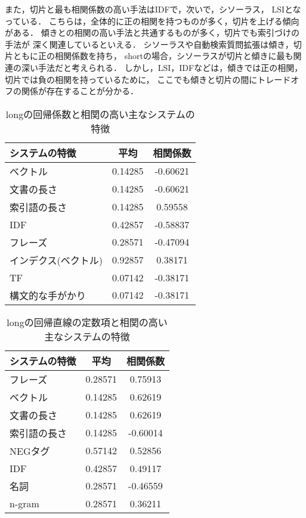 また，切片と最も相関係数の高い手法はIDFで，次いで，シソーラス，
LSIとなっている．
こちらは，全体的に正の相関を持つものが多く，切片を上げる傾向がある．
傾きとの相関の高い手法と共通するものが多く，切片でも索引づけの手法が
深く関連しているといえる．
シソーラスや自動検索質問拡張は傾き，切片ともに正の相関係数を持ち，
shortの場合，シソーラスが切片と傾きに最も関連の深い手法だと考えられる．
しかし，LSI，IDFなどは，傾きでは正の相関，切片では負の相関を持っているために，
ここでも傾きと切片の間にトレードオフの関係が存在することが分かる．

\begin{table}[t]
\renewcommand{\arraystretch}{}
\caption{longの回帰係数と相関の高い主なシステムの特徴}
\centering
\small
\label{coe_l_sys}
\begin{tabular}{lcc} 
システムの特徴 		&   平均  & 相関係数 \\ \hline
ベクトル		& 0.14285 & -0.60621 \\
文書の長さ 		& 0.14285 & -0.60621 \\
索引語の長さ	        & 0.14285 &  0.59558 \\
IDF      		& 0.42857 & -0.58837 \\
フレーズ        	& 0.28571 & -0.47094 \\
インデクス(ベクトル)    & 0.92857 &  0.38171 \\
TF       	 	& 0.07142 & -0.38171 \\
構文的な手がかり	& 0.07142 & -0.38171 \\ \hline
\end{tabular}
\end{table}

\begin{table}[t]
\renewcommand{\arraystretch}{}
\caption{longの回帰直線の定数項と相関の高い主なシステムの特徴}
\centering
\small
\label{con_l_sys}
\begin{tabular}{lcc} 
システムの特徴 		&   平均  & 相関係数\\ \hline
フレーズ		& 0.28571 &  0.75913\\
ベクトル		& 0.14285 &  0.62619\\
文書の長さ 		& 0.14285 &  0.62619\\
索引語の長さ      	& 0.14285 & -0.60014\\
NEGタグ             	& 0.57142 &  0.52856\\
IDF      		& 0.42857 &  0.49117\\
名詞             	& 0.28571 & -0.46559\\ 
n-gram           	& 0.28571 &  0.36211\\ \hline
\end{tabular}
\end{table}

